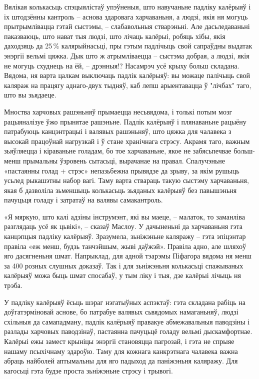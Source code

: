 Вялікая колькасьць спэцыялістаў упэўненыя, што навучаньне падліку калёрыяў і іх штодзённы кантроль – аснова здаровага харчаваньня, а людзі, якія ня могуць прытрымлівацца гэтай сыстэмы, – слабавольныя стварэньні. Але дасьледаваньні паказваюць, што нават тыя людзі, што лічаць калёрыі, робяць хібы, якія даходзяць да 25\,\% калярыйнасьці, пры гэтым падлічыць свой сапраўдны выдатак энэргіі вельмі цяжка. Дык што ж атрымліваецца – сыстэма добрая, а людзі, якія не могуць схуднець на ёй, – дрэнныя!? Насамрэч усё крыху больш складана. Вядома, ня варта цалкам выключаць падлік калёрыяў: вы можаце палічыць свой каляраж на працягу аднаго-двух тыдняў, каб лепш арыентавацца ў "лічбах" таго, што вы зьядаеце.

Мноства харчовых рашэньняў прымаецца несьвядома, і толькі потым мозг рацыяналізуе ўжо прынятае рашэньне. Падлік калёрыяў і плянаваньне рацыёну патрабуюць канцэнтрацыі і валявых рашэньняў, што цяжка для чалавека з высокай працоўнай нагрузкай і ў стане хранічнага стрэсу. Акрамя таго, важным зьяўляецца і кіраваньне голадам, бо тое харчаваньне, якое не забясьпечвае больш-менш прымальны ўзровень сытасьці, вырачанае на правал. Спалучэньне «пастаянны голад + стрэс» непазьбежна прывядзе да зрыву, за якім рушыць усьлед рыкашэтны набор вагі. Таму варта ствараць такую сыстэму харчаваньня, якая б дазволіла зьменшыць колькасьць зьяданых калёрыяў без павышэньня пачуцьця голаду і затратаў на валявы самакантроль.

«Я мяркую, што калі адзіны інструмэнт, які вы маеце, – малаток, то заманліва разглядаць усё як цьвікі», -- сказаў Маслоу. У дачыненьні да харчаваньня гэта канцэпцыя падліку калёрыяў. Зразумела, зьніжэньне каляражу – гэта эпіцэнтар правіла «еж менш, будзь танчэйшым, жыві даўжэй». Правіла адно, але шляхоў яго дасягненьня шмат. Напрыклад, для адной тэарэмы Піфагора вядома ня менш за 400 розных слушных доказаў. Так і для зьніжэньня колькасьці спажываных калёрыяў можа быць шмат спосабаў, у тым ліку і тыя, дзе калёрыі лічыць ня трэба.

У падліку калёрыяў ёсьць шэраг нэгатыўных аспэктаў: гэта складана рабіць на доўгатэрміновай аснове, бо патрабуе валявых сьвядомых намаганьняў, людзі схільныя да самападману, падлік калёрыяў правакуе абмежавальныя паводзіны і разлады харчовых паводзінаў, пастаянна пачуцьцё голаду вельмі дыскамфортнае. Калёрыі ежы замест крыніцы энэргіі становяцца пагрозай, і гэта не спрыяе нашаму псыхічнаму здароўю. Таму для кожнага канкрэтнага чалавека важна абраць найболей аптымальны для яго падыход да паніжэньня каляражу. Для кагосьці гэта будзе проста зьніжэньне стрэсу і трывогі.

